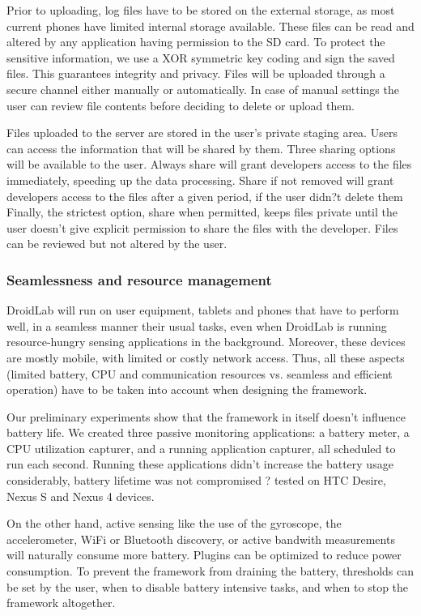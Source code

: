 \documentclass[conference,letterpaper]{IEEEtran}
\begin{document}
Prior to uploading, log files have to be stored on the external storage, as most current phones have limited internal storage available. These files can be read and altered by any application having permission to the SD card. To protect the sensitive information, we use a XOR symmetric key coding and sign the saved files. This guarantees integrity and privacy. Files will be uploaded through a secure channel either manually or automatically. In case of manual settings the user can review file contents before deciding to delete or upload them.

Files uploaded to the server are stored in the user's private staging area. Users can access the information that will be shared by them. Three sharing options will be available to the user. Always share will grant developers access to the files immediately, speeding up the data processing. Share if not removed will grant developers access to the files after a given period, if the user didn?t delete them Finally, the strictest option, share when permitted, keeps files private until the user doesn't give explicit permission to share the files with the developer. Files can be reviewed but not altered by the user.

\subsubsection{Seamlessness and resource management}

DroidLab will run on user equipment, tablets and phones that have to perform well, in a seamless manner their usual tasks, even when DroidLab is running resource-hungry sensing applications in the background. Moreover, these devices are mostly mobile, with limited or costly network access. Thus, all these aspects (limited battery, CPU and communication resources vs. seamless and efficient operation) have to be taken into account when designing the framework. 

Our preliminary experiments show that the framework in itself doesn't influence battery life. We created three passive monitoring applications: a battery meter, a CPU utilization capturer, and a running application capturer, all scheduled to run each second. Running these applications didn't increase the battery usage considerably, battery lifetime was not compromised ? tested on HTC Desire, Nexus S and Nexus 4 devices.

On the other hand, active sensing like the use of the gyroscope, the accelerometer, WiFi or Bluetooth discovery, or active bandwith measurements will naturally consume more battery. Plugins can be optimized to reduce power consumption. To prevent the framework from draining the battery, thresholds can be set by the user, when to disable battery intensive tasks, and when to stop the framework altogether.
\end{document}
